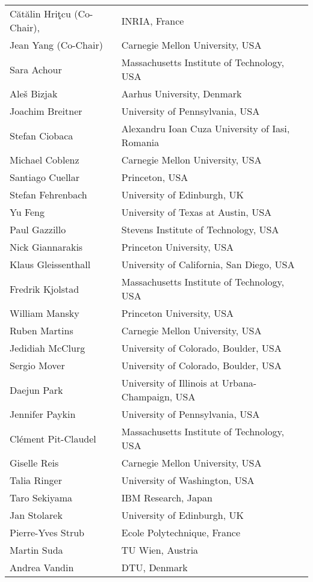 \begin{tabular}{@{}p{\namewidth}l@{}}
C\u{a}t\u{a}lin Hri\c{t}cu (Co-Chair),
  & INRIA, France \\
Jean Yang (Co-Chair)
  & Carnegie Mellon University, USA \\
Sara Achour
  & Massachusetts Institute of Technology, USA \\
Aleš Bizjak
  & Aarhus University, Denmark \\
Joachim Breitner
  & University of Pennsylvania, USA \\
Stefan Ciobaca
  & Alexandru Ioan Cuza University of Iasi, Romania \\
Michael Coblenz
  & Carnegie Mellon University, USA  \\
Santiago Cuellar
  & Princeton, USA \\
Stefan Fehrenbach
  & University of Edinburgh, UK \\
Yu Feng
  & University of Texas at Austin, USA \\
Paul Gazzillo
  & Stevens Institute of Technology, USA \\
Nick Giannarakis
  & Princeton University, USA \\
Klaus Gleissenthall
  & University of California, San Diego, USA \\
Fredrik Kjolstad
  & Massachusetts Institute of Technology, USA \\
William Mansky
  & Princeton University, USA \\
Ruben Martins
  & Carnegie Mellon University, USA \\
Jedidiah McClurg
  & University of Colorado, Boulder, USA \\
Sergio Mover
  & University of Colorado, Boulder, USA \\
Daejun Park
  & University of Illinois at Urbana-Champaign, USA \\
Jennifer Paykin
  & University of Pennsylvania, USA \\
Clément Pit-Claudel
  & Massachusetts Institute of Technology, USA \\
Giselle Reis
  & Carnegie Mellon University, USA \\
Talia Ringer
  & University of Washington, USA \\
Taro Sekiyama
  & IBM Research, Japan \\
Jan Stolarek
  & University of Edinburgh, UK  \\
Pierre-Yves Strub
  & Ecole Polytechnique, France \\
Martin Suda
  & TU Wien, Austria \\
Andrea Vandin
  & DTU, Denmark \\
\end{tabular}


\newpage
